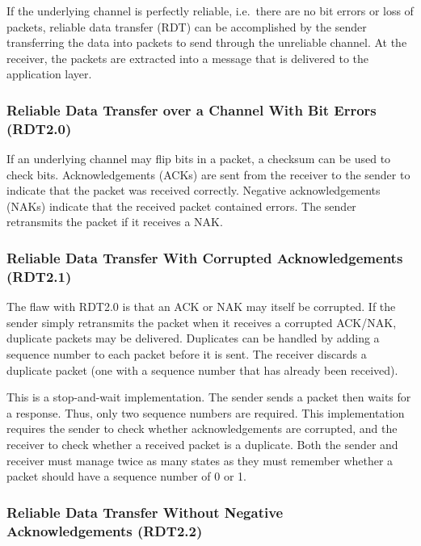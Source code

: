 If the underlying channel is perfectly reliable, i.e.\ there are no bit errors or loss of packets, reliable data transfer (RDT) can be accomplished by the sender transferring the data into packets to send through the unreliable channel.
At the receiver, the packets are extracted into a message that is delivered to the application layer.

\subsubsection[RDT over a Channel With Bit Errors (RDT2.0)]{Reliable Data Transfer over a Channel With Bit Errors (RDT2.0)}

If an underlying channel may flip bits in a packet, a checksum can be used to check bits.
Acknowledgements (ACKs) are sent from the receiver to the sender to indicate that the packet was received correctly.
Negative acknowledgements (NAKs) indicate that the received packet contained errors.
The sender retransmits the packet if it receives a NAK\@.

\subsubsection[RDT With Corrupted Acknowledgements (RDT2.1)]{Reliable Data Transfer With Corrupted Acknowledgements (RDT2.1)}

The flaw with RDT2.0 is that an ACK or NAK may itself be corrupted.
If the sender simply retransmits the packet when it receives a corrupted ACK/NAK, duplicate packets may be delivered.
Duplicates can be handled by adding a sequence number to each packet before it is sent.
The receiver discards a duplicate packet (one with a sequence number that has already been received).

This is a stop-and-wait implementation.
The sender sends a packet then waits for a response.
Thus, only two sequence numbers are required.
This implementation requires the sender to check whether acknowledgements are corrupted, and the receiver to check whether a received packet is a duplicate.
Both the sender and receiver must manage twice as many states as they must remember whether a packet should have a sequence number of \num{0} or \num{1}.

\subsubsection[RDT Without Negative Acknowledgements (RDT2.2)]{Reliable Data Transfer Without Negative Acknowledgements (RDT2.2)}

